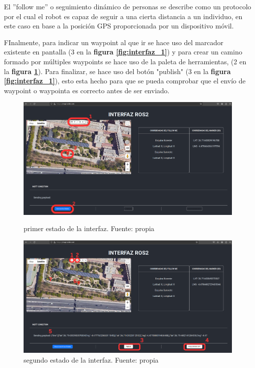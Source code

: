 El ''follow me'' o seguimiento dinámico de personas se describe como un protocolo por el cual el robot es capaz de seguir a una cierta distancia a un individuo, en este caso en base 
a la posición GPS proporcionada por un dispositivo móvil.

FInalmente, para indicar un waypoint al que ir se hace uso del marcador existente en pantalla 
(3 en la \textbf{figura \ref{fig:interfaz_1}}) y para crear un camino formado por múltiples waypoints se hace uso de la paleta de 
herramientas, (2 en la \textbf{figura \ref{fig:interfaz_2}}). Para finalizar, se hace uso del botón "publish" 
(3 en la \textbf{figura \ref{fig:interfaz_1}}), esto esta hecho para que se pueda comprobar que el envío de waypoint o waypointa es correcto antes 
de ser enviado.

\begin{figure}[htbp]
  \centering
  \begin{minipage}[b]{0.45\textwidth}
    \centering
    \includegraphics[width=\textwidth]{images/interfaz_1.png}
    \caption{primer estado de la interfaz. Fuente: propia}
    \label{fig:interfaz_1}
  \end{minipage}
  \hfill
  \begin{minipage}[b]{0.45\textwidth}
    \centering
    \includegraphics[width=\textwidth]{images/interfaz_2.png}
    \caption{segundo estado de la interfaz. Fuente: propia}
    \label{fig:interfaz_2}
  \end{minipage}
\end{figure}

